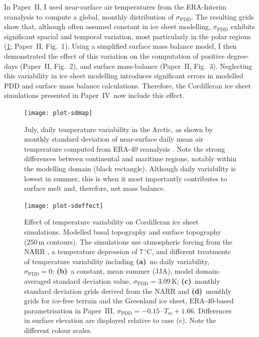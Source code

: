 \documentclass[a4paper]{kappa}
\newcommand{\sPDD}[0]{\sigma_{\mathrm{PDD}}}
\newcommand{\unit}[1]{\ensuremath{\mathrm{#1}}}
\newcommand{\degree}[0]{\ensuremath{^{\circ}}}
\newcommand{\degC}[0]{\unit{{\degree}C}}
\newcommand{\PSDV}[0]{Paper~II}     %
\newcommand{\PSDP}[0]{Paper~III}    %
\newcommand{\CCYC}[0]{Paper~IV}     %
\begin{document}
In \PSDV, I used near-surface air temperatures from the ERA-Interim reanalysis
\citep{Dee.etal.2011} to compute a global, monthly distribution of $\sPDD$. The
resulting grids show that, although often assumed constant in ice sheet
modelling, $\sPDD$ exhibits significant spacial and temporal variation, most
particularly in the polar regions (\cref{fig:plot-sdmap}; \PSDV, Fig.~1). Using
a simplified surface mass balance model, I then demonstrated the effect of this
variation on the computation of positive degree-days (\PSDV, Fig.~2), and
surface mass-balance (\PSDV, Fig.~3). Neglecting this variability in ice sheet
modelling introduces significant errors in modelled PDD and surface mass
balance calculations. Therefore, the Cordilleran ice sheet simulations
presented in \CCYC\ now include this effect.

\begin{figure}
  \texttt{[image: plot-sdmap]}
  \caption{July, daily temperature variability in the Arctic, as shown by
           monthly standard deviation of near-surface daily mean air
           temperature computed from ERA-40 reanalysis
           \citep{Uppala.etal.2005}. Note the strong differences between
           continental and maritime regions, notably within the modelling domain
           (black rectangle). Although daily variability is lowest in summer,
           this is when it most importantly contributes to surface melt and,
           therefore, net mass balance.}
  \label{fig:plot-sdmap}
\end{figure}

\begin{figure}
  \texttt{[image: plot-sdeffect]}
  \caption{Effect of temperature variability on Cordilleran ice sheet
           simulations. Modelled basal topography and surface topography
           (250\,m contours). The simulations use atmospheric forcing from the
           NARR \citep{Mesinger.etal.2006}, a temperature depression of
           7\,\degC, and different treatments of temperature variability
           including
           \textbf{(a)}~no daily variability, $\sPDD=0$;
           \textbf{(b)}~a constant, mean summer (JJA), model domain-averaged
           standard deviation value, $\sPDD=3.09$\,K;
           \textbf{(c)}~monthly standard deviation grids derived from the NARR
           and
           \textbf{(d)}~monthly grids for ice-free terrain and the
           Greenland ice sheet, ERA-40-based \citep{Uppala.etal.2005}
           parametrisation in \PSDP, ${\sPDD=-0.15\cdot{T_m}+1.66}$.
           Differences in surface elevation are displayed relative to case (c).
           Note the different colour scales.}
  \label{fig:plot-sdeffect}
\end{figure}
\end{document}
